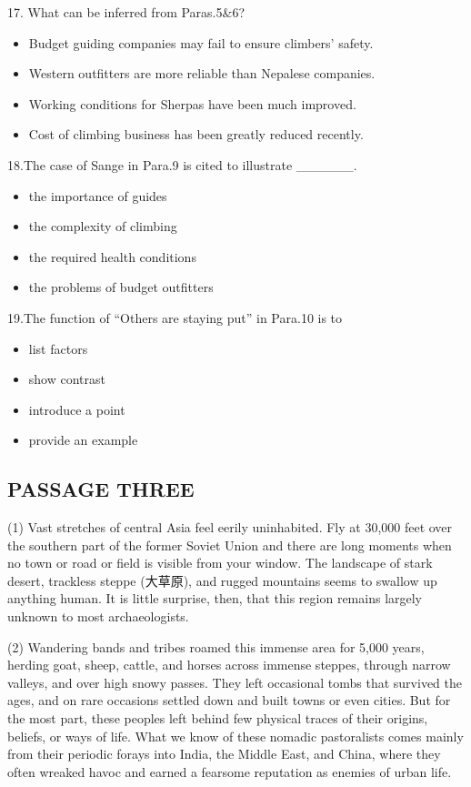 \documentclass[UTF8,11pt]{ctexart}
\begin{document}
17. What can be inferred from Paras.5\&6?


\begin{itemize}[leftmargin=2em,itemsep=.2em,topsep=.4em]\item[A.] Budget guiding companies may fail to ensure climbers’ safety.
\item[B.] Western outfitters are more reliable than Nepalese companies.
\item[C.] Working conditions for Sherpas have been much improved.
\item[D.] Cost of climbing business has been greatly reduced recently.
\end{itemize}

18.The case of Sange in Para.9 is cited to illustrate \_\_\_\_\_\_.


\begin{itemize}[leftmargin=2em,itemsep=.2em,topsep=.4em]\item[A.] the importance of guides
\item[B.] the complexity of climbing
\item[C.] the required health conditions
\item[D.] the problems of budget outfitters
\end{itemize}

19.The function of “Others are staying put” in Para.10 is to


\begin{itemize}[leftmargin=2em,itemsep=.2em,topsep=.4em]\item[A.] list factors
\item[B.] show contrast
\item[C.] introduce a point
\item[D.] provide an example
\end{itemize}

\subsection*{\textbf{PASSAGE THREE}}


(1) Vast stretches of central Asia feel eerily uninhabited. Fly at 30,000 feet over the southern part of the former Soviet Union and there are long moments when no town or road or field is visible from your window. The landscape of stark desert, trackless steppe (大草原), and rugged mountains seems to swallow up anything human. It is little surprise, then, that this region remains largely unknown to most archaeologists.


(2) Wandering bands and tribes roamed this immense area for 5,000 years, herding goat, sheep, cattle, and horses across immense steppes, through narrow valleys, and over high snowy passes. They left occasional tombs that survived the ages, and on rare occasions settled down and built towns or even cities. But for the most part, these peoples left behind few physical traces of their origins, beliefs, or ways of life. What we know of these nomadic pastoralists comes mainly from their periodic forays into India, the Middle East, and China, where they often wreaked havoc and earned a fearsome reputation as enemies of urban life.
\end{document}
